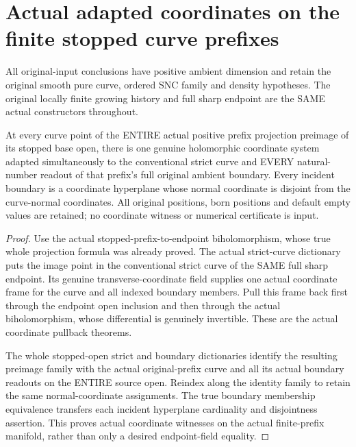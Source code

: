 \section{Actual adapted coordinates on the finite stopped curve prefixes}

All original-input conclusions have positive ambient dimension and retain
the original smooth pure curve, ordered SNC family and density hypotheses.
The original locally finite growing history and full sharp endpoint are
the SAME actual constructors throughout.

\begin{theorem}
\label{hir:sharp-actual-curve-stopped-prefix-adapted-coordinates}
\leanok
At every curve point of the ENTIRE actual positive prefix projection
preimage of its stopped base open, there is one genuine holomorphic
coordinate system adapted simultaneously to the conventional strict
curve and EVERY natural-number readout of that prefix's full original
ambient boundary. Every incident boundary is a coordinate hyperplane
whose normal coordinate is disjoint from the curve-normal coordinates.
All original positions, born positions and default empty values are
retained; no coordinate witness or numerical certificate is input.
\end{theorem}
\begin{proof}
Use the actual stopped-prefix-to-endpoint biholomorphism, whose true whole
projection formula was already proved. The actual strict-curve dictionary
puts the image point in the conventional strict curve of the SAME full
sharp endpoint. Its genuine transverse-coordinate field supplies one
actual coordinate frame for the curve and all indexed boundary members.
Pull this frame back first through the endpoint open inclusion and then
through the actual biholomorphism, whose differential is genuinely
invertible. These are the actual coordinate pullback theorems.

The whole stopped-open strict and boundary dictionaries identify the
resulting preimage family with the actual original-prefix curve and all
its actual boundary readouts on the ENTIRE source open. Reindex along
the identity family to retain the same normal-coordinate assignments.
The true boundary membership equivalence transfers each incident
hyperplane cardinality and disjointness assertion. This proves actual
coordinate witnesses on the actual finite-prefix manifold, rather than
only a desired endpoint-field equality.
\end{proof}


